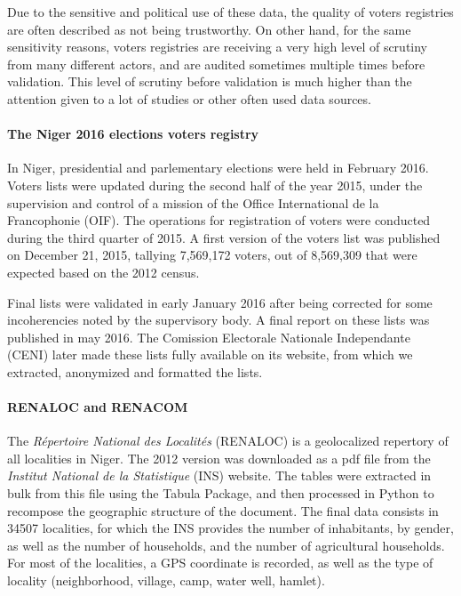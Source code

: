 \documentclass[12pt]{article}\usepackage[]{graphicx}\usepackage[]{color}
\begin{document}
Due to the sensitive and political use of these data, the quality of voters registries are often described as not being trustworthy. On other hand, for the same sensitivity reasons, voters registries are receiving a very high level of scrutiny from many different actors, and are audited sometimes multiple times before validation. This level of scrutiny before validation is much higher than the attention given to a lot of studies or other often used data sources.

\paragraph{The Niger 2016 elections voters registry} In Niger, presidential and parlementary elections were held in February 2016. Voters lists were updated during the second half of the year 2015, under the supervision and control of a mission of the Office International de la Francophonie (OIF). The operations for registration of voters were conducted during the third quarter of 2015. A first version of the voters list was published on December 21, 2015, tallying 7,569,172 voters, out of 8,569,309 that were expected based on the 2012 census.

Final lists were validated in early January 2016 after being corrected for some incoherencies noted by the supervisory body. A final report on these lists was published in may 2016. The Comission Electorale Nationale Independante (CENI) later made these lists fully available on its website, from which we extracted, anonymized and formatted the lists.

\paragraph{RENALOC and RENACOM} The \textit{Répertoire National des Localités} (RENALOC) is a geolocalized repertory of all localities in Niger.  The 2012 version was downloaded as a pdf file from the \textit{Institut National de la Statistique} (INS) website. The tables were extracted in bulk from this file using the Tabula Package, and then processed in Python to recompose the geographic structure of the document. The final data consists in 34507 localities, for which the INS provides the number of inhabitants, by gender, as well as the number of households, and the number of agricultural households. For most of the localities, a GPS coordinate is recorded, as well as the type of locality (neighborhood, village, camp, water well, hamlet).
\end{document}
